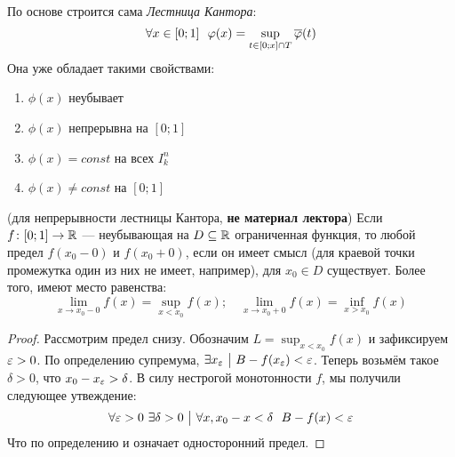 \begin{reminder}
	По основе строится сама \textit{Лестница Кантора}:
	\[
		\forall x \in [0; 1]\ \ \varphi(x) = \sup_{t \in [0; x] \cap T} \overline{\varphi}(t)
	\]
	Она уже обладает такими свойствами:
	\begin{enumerate}
		\item $\phi(x)$ неубывает
		
		\item $\phi(x)$ непрерывна на $[0; 1]$
		
		\item $\phi(x) = const$ на всех $I_k^n$
		
		\item $\phi(x) \neq const$ на $[0; 1]$
	\end{enumerate}
\end{reminder}

\begin{lemma} (для непрерывности лестницы Кантора, \textbf{не материал лектора})
	Если $f \colon [0; 1] \to \mathbb{R}$ --- неубывающая на $D \subseteq \mathbb{R}$ ограниченная функция, то любой предел $f(x_0 - 0)$ и $f(x_0 + 0)$, если он имеет смысл (для краевой точки промежутка один из них не имеет, например), для $x_0 \in D$ существует. Более того, имеют место равенства:
	\[
		\lim_{x \to x_0-0} f(x) = \sup_{x < x_0} f(x); \quad \lim_{x \to x_0+0} f(x) = \inf_{x > x_0} f(x)
	\]
\end{lemma}

\begin{proof}
	Рассмотрим предел снизу. Обозначим $L = \sup_{x < x_0} f(x)$ и зафиксируем $\varepsilon > 0$. По определению супремума, $\exists x_{\varepsilon} \ \big|\  B - f(x_{\varepsilon}) < \varepsilon$. Теперь возьмём такое $\delta > 0$, что $x_0 - x_{\varepsilon} > \delta$. В силу нестрогой монотонности $f$, мы получили следующее утвеждение:
	\[
		\forall \eps > 0\ \exists \delta > 0 \such \forall x, x_0 - x < \delta\ \ B - f(x) < \eps
	\]
	Что по определению и означает односторонний предел.
\end{proof}

